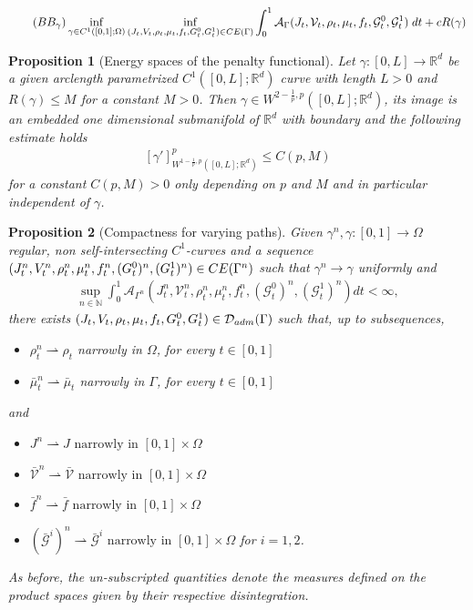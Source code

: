 \documentclass[10pt,a4paper]{amsart}
\newtheorem{proposition}{Proposition}
\def\R{{\mathbb R}}
\def\calA{{\mathcal A}} \def\calB{{\mathcal B}} \def\calC{{\mathcal C}}
\begin{document}
\begin{align}\label{eq:BBgamma}\tag{$BB_\gamma$}
\inf_{\gamma \in C^{1}([0,1];\Omega)}\inf _{(J_t, V_t, \rho_t, \mu_t, f_t, G_t^0, G_t^1) \in {\rm CE(\Gamma)}}  \int_{0}^{1} \calA_\Gamma (J_t, \mathcal{V}_t, \rho_t, \mu_t, f_t, \mathcal{G}_t^0, \mathcal{G}_t^1)\;d t + c R(\gamma)
\end{align}

\begin{proposition}[Energy spaces of the penalty functional]\label{EnergySpaces}
    Let $\gamma:[0,L]\to\R^d$ be a given arclength parametrized $C^{1}([0,L];\R^d)$ curve with length $L>0$ and $R(\gamma) \leq M$ for a constant $M>0$.
    Then $\gamma\in W^{2-\frac{1}{p},p}([0,L];\R^d)$, its image is an embedded one dimensional submanifold of $\R^d$ with boundary and the following estimate holds 
    \begin{align}\label{eq:estimate}
        [\gamma']^p_{W^{1 - \frac{1}{p}, p}([0,L];\R^d)} \leq C(p,M)
    \end{align}
    for a constant $C(p,M) > 0$ only depending on $p$ and $M$ and in particular independent of $\gamma$.
\end{proposition}

\begin{proposition}[Compactness for varying paths]
\label{thm:compactVarPath}
Given $\gamma^n,\gamma : [0,1] \rightarrow \Omega$ regular, non self-intersecting $C^1$-curves and a sequence $(J_t^n,V_t^n,\rho_t^n,\mu_t^n,f_t^n,(G_t^0)^n,(G_t^1)^n) \in {\rm CE}(\Gamma^n)$ such that $\gamma^n \rightarrow \gamma$ uniformly and
\begin{align*}
    \sup_{n\in \mathbb{N}} \int_0^1 \calA_{\Gamma^n}( J_t^n,\mathcal{V}_t^n,\rho_t^n,\mu_t^n,f_t^n,(\mathcal{G}^0_t)^n,(\mathcal{G}_t^1)^n)dt < \infty,
\end{align*}
there exists $(J_t,V_t,\rho_t,\mu_t,f_t, G_t^0,G_t^1) \in \mathcal{D}_{\rm adm}(\Gamma)
$ such that, up to subsequences, 
\begin{itemize}
    \item[i)] $\rho^n_t \rightharpoonup \rho_t$ narrowly in $\Omega$, for every $t \in [0,1]$
    \item[ii)]  $\bar \mu^n_t  \rightharpoonup \bar \mu_t$ narrowly in $\Gamma$, for every  $t \in [0,1]$
\end{itemize} 
and 
\begin{itemize}
    \item[iii)] $J^n \rightharpoonup J \text{ narrowly in } [0,1] \times \Omega$
    \item[iv)] $\bar{\mathcal{V}}^n  \rightharpoonup \bar{\mathcal{V}}  \text{ narrowly in } [0,1] \times \Omega$
    \item[v)] $\bar f^n  \rightharpoonup \bar f  \text{ narrowly in } [0,1] \times \Omega$
    \item[vi)] $( \bar{\mathcal{G}}^i)^n \rightharpoonup  \bar{\mathcal{G}}^i \text{ narrowly in } [0,1] \times \Omega$ for $i=1,2$.
\end{itemize}
As before, the un-subscripted quantities denote the measures defined on the product spaces given by their respective disintegration.
\end{proposition}
\end{document}
